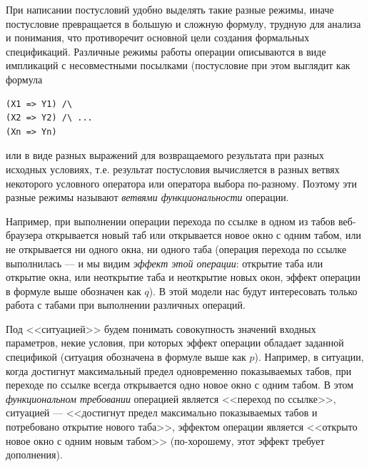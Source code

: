 \documentclass[14pt, twoside]{extreport}
\begin{document}
При написании постусловий удобно выделять такие разные режимы, иначе постусловие превращается в большую и сложную формулу, трудную для анализа и понимания, что противоречит основной цели создания формальных спецификаций. Различные режимы работы операции описываются в виде импликаций с несовместными посылками (постусловие при этом выглядит как формула
\begin{lstlisting}
(X1 => Y1) /\
(X2 => Y2) /\ ...
(Xn => Yn)
\end{lstlisting}

или в виде разных выражений для возвращаемого результата при разных исходных условиях, т.е. результат постусловия вычисляется в разных ветвях некоторого условного оператора или оператора выбора по-разному. Поэтому эти разные режимы называют \emph{ветвями функциональности} операции.

Например, при выполнении операции перехода по ссылке в одном из табов веб-браузера открывается новый таб или открывается новое окно с одним табом, или не открывается ни одного окна, ни одного таба (операция перехода по ссылке выполнилась --- и мы видим \emph{эффект этой операции}: открытие таба или открытие окна, или неоткрытие таба и неоткрытие новых окон, эффект операции в формуле выше обозначен как $q$). В этой модели нас будут интересовать только работа с табами при выполнении различных операций.

Под <<ситуацией>> будем понимать совокупность значений входных параметров, некие условия, при которых эффект операции обладает заданной спецификой (ситуация обозначена в формуле выше как $p$). Например, в ситуации, когда достигнут максимальный предел одновременно показываемых табов, при переходе по ссылке всегда открывается одно новое окно с одним табом. В этом \emph{функциональном требовании} операцией является <<переход по ссылке>>, ситуацией --- <<достигнут предел максимально показываемых табов и потребовано открытие нового таба>>, эффектом операции является <<открыто новое окно с одним новым табом>> (по-хорошему, этот эффект требует дополнения).
\end{document}
